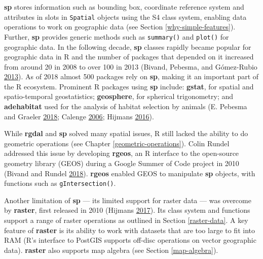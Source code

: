 \documentclass[]{krantz}
\begin{document}
\textbf{sp} stores information such as bounding box, coordinate reference system and attributes in slots in \texttt{Spatial} objects using the S4 class system,
enabling data operations to work on geographic data (see Section \ref{why-simple-features}).
Further, \textbf{sp} provides generic methods such as \texttt{summary()} and \texttt{plot()} for geographic data.
In the following decade, \textbf{sp} classes rapidly became popular for geographic data in R and the number of packages that depended on it increased from around 20 in 2008 to over 100 in 2013 (Bivand, Pebesma, and Gómez-Rubio \protect\hyperlink{ref-bivand_applied_2013}{2013}).
As of 2018 almost 500 packages rely on \textbf{sp}, making it an important part of the R ecosystem.
Prominent R packages using \textbf{sp} include: \textbf{gstat}, for spatial and spatio-temporal geostatistics; \textbf{geosphere}, for spherical trigonometry; and \textbf{adehabitat} used for the analysis of habitat selection by animals (E. Pebesma and Graeler \protect\hyperlink{ref-R-gstat}{2018}; Calenge \protect\hyperlink{ref-calenge_package_2006}{2006}; Hijmans \protect\hyperlink{ref-hijmans_geosphere_2016}{2016}).

While \textbf{rgdal} and \textbf{sp} solved many spatial issues, R still lacked the ability to do geometric operations (see Chapter \ref{geometric-operations}).
Colin Rundel addressed this issue by developing \textbf{rgeos}, an R interface to the open-source geometry library (GEOS) during a Google Summer of Code project in 2010 (Bivand and Rundel \protect\hyperlink{ref-R-rgeos}{2018}).
\textbf{rgeos} enabled GEOS to manipulate \textbf{sp} objects, with functions such as \texttt{gIntersection()}.

Another limitation of \textbf{sp} --- its limited support for raster data --- was overcome by \textbf{raster}, first released in 2010 (Hijmans \protect\hyperlink{ref-R-raster}{2017}).
Its class system and functions support a range of raster operations as outlined in Section \ref{raster-data}.
A key feature of \textbf{raster} is its ability to work with datasets that are too large to fit into RAM (R's interface to PostGIS supports off-disc operations on vector geographic data).
\textbf{raster} also supports map algebra (see Section \ref{map-algebra}).
\end{document}
